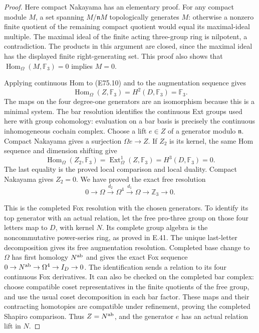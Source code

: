 \begin{proof}
Here compact Nakayama has an elementary proof.
For any compact module $M$, a set spanning
$M/\mathfrak nM$ topologically generates $M$:
otherwise a nonzero finite quotient of the remaining
compact quotient would equal its maximal-ideal
multiple. The maximal ideal of the finite acting
three-group ring is nilpotent, a contradiction.
The products in this argument are closed, since
the maximal ideal has the displayed finite
right-generating set. This proof also shows that
$\operatorname{Hom}_\Omega(M,\mathbb F_3)=0$
implies $M=0$.

Applying continuous Hom to (E75.10) and to the
augmentation sequence gives
\[
 \operatorname{Hom}_\Omega(Z,\mathbb F_3)
      =H^2(D,\mathbb F_3)=\mathbb F_3.
 \tag{E75.11}
\]
The maps on the four degree-one generators are an
isomorphism because this is a minimal system.
The bar resolution identifies the continuous
Ext groups used here with group cohomology:
evaluation on a bar basis is precisely the
continuous inhomogeneous cochain complex.
Choose a lift $e\in Z$ of a generator modulo
$\mathfrak n$. Compact Nakayama gives a
surjection $\Omega e\to Z$.
If $Z_2$ is its kernel, the same Hom sequence
and dimension shifting give
\[
 \operatorname{Hom}_\Omega(Z_2,\mathbb F_3)
   =\operatorname{Ext}^1_\Omega(Z,\mathbb F_3)
   =H^3(D,\mathbb F_3)=0.
 \tag{E75.12}
\]
The last equality is the proved local comparison
and local duality. Compact Nakayama gives $Z_2=0$.
We have proved the exact free resolution
\[
 0\longrightarrow\Omega
   \xrightarrow{d_2}\Omega^4
   \xrightarrow{d_1}\Omega
   \longrightarrow\mathbb Z_3\longrightarrow0.
 \tag{E75.13}
\]

This is the completed Fox resolution with the
chosen generators. To identify its top generator
with an actual relation, let the free pro-three
group on those four letters map to $D$, with
kernel $N$. Its complete group algebra is the
noncommutative power-series ring, as proved in
E.41. The unique last-letter decomposition gives
its free augmentation resolution. Completed
base change to $\Omega$ has first homology
$N^{\rm ab}$ and gives the exact Fox sequence
$0\to N^{\rm ab}\to\Omega^4\to I_D\to0$.
The identification sends a relation to its four
continuous Fox derivatives. It can also be
checked on the completed bar complex: choose
compatible coset representatives in the finite
quotients of the free group, and use the usual
coset decomposition in each bar factor. These
maps and their contracting homotopies are
compatible under refinement, proving the
completed Shapiro comparison. Thus $Z=N^{\rm ab}$,
and the generator $e$ has an actual relation
lift in $N$.


\end{proof}
